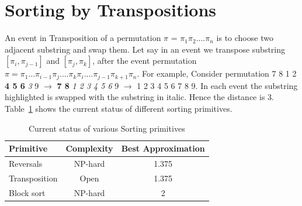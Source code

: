 \documentclass[BTech]{iitmdiss}
\begin{document}
\section{Sorting by Transpositions}
An event in Transposition of a permutation $\pi$ = $\pi_1\pi_2....\pi_n$ is to choose two adjacent substring and swap them. Let say in an event we transpose substring $[\pi_i,\pi_{j-1}]$ and $[\pi_j,\pi_k]$, after the event permutation $\pi = \pi_1...\pi_{i-1}\pi_j....\pi_k\pi_i....\pi_{j-1}\pi_{k+1}\pi_n$. For example, Consider permutation 7 8 1 2 \textbf{4 5 6} \textit{3} 9 $\rightarrow$ \textbf{7 8} \textit{1 2 3 4 5 6} 9 $\rightarrow$ 1 2 3 4 5 6 7 8 9. In each event the substring highlighted is swapped with the substring in italic. Hence the distance is 3.\\
Table~\ref{tab:sample} shows the current status of different sorting primitives.

\begin{table}[htbp]
  \caption{Current status of various Sorting primitives}
  \begin{center}
  \begin{tabular}[c]{|l|c|c|} \hline
    \textbf{Primitive} & \textbf{Complexity} & \textbf{Best Approximation}\\ \hline
    Reversals & NP-hard & 1.375  \\ \hline
    Transposition & Open & 1.375 \\ \hline
    Block sort & NP-hard & 2 \\ \hline
  \end{tabular}
  \label{tab:sample}
  \end{center}
\end{table}
\end{document}
